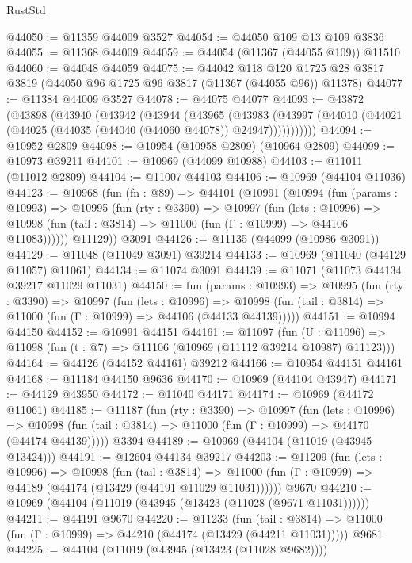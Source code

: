 \begin{lexlean}{RustStd}
\begin{coremodule}
@44050 := @11359 @44009 @3527
@44054 := @44050 @109 @13 @109 @3836
@44055 := @11368 @44009
@44059 := @44054 (@11367 (@44055 @109)) @11510
@44060 := @44048 @44059
@44075 := @44042
    @118
    @120
    @1725
    @28
    @3817
    @3819
    (@44050 @96 @1725 @96 @3817 (@11367 (@44055 @96)) @11378)
@44077 := @11384 @44009 @3527
@44078 := @44075 @44077
@44093 := @43872
    (@43898
      (@43940
        (@43942
          (@43944
            (@43965
              (@43983
                (@43997 (@44010 (@44021 (@44025 (@44035 (@44040 (@44060 @44078)) @24947)))))))))))
@44094 := @10952 @2809
@44098 := @10954 (@10958 @2809) (@10964 @2809)
@44099 := @10973 @39211
@44101 := @10969 (@44099 @10988)
@44103 := @11011 (@11012 @2809)
@44104 := @11007 @44103
@44106 := @10969 (@44104 @11036)
@44123 := @10968
    (fun (fn : @89) =>
    @44101
      (@10991
        (@10994
          (fun (params : @10993) =>
          @10995
            (fun (rty : @3390) =>
            @10997
              (fun (lets : @10996) =>
              @10998 (fun (tail : @3814) => @11000 (fun (Γ : @10999) => @44106 @11083))))))
        @11129))
    @3091
@44126 := @11135 (@44099 (@10986 @3091))
@44129 := @11048 (@11049 @3091) @39214
@44133 := @10969 (@11040 (@44129 @11057) @11061)
@44134 := @11074 @3091
@44139 := @11071 (@11073 @44134 @39217 @11029 @11031)
@44150 := fun (params : @10993) =>
  @10995
    (fun (rty : @3390) =>
    @10997
      (fun (lets : @10996) =>
      @10998 (fun (tail : @3814) => @11000 (fun (Γ : @10999) => @44106 (@44133 @44139)))))
@44151 := @10994 @44150
@44152 := @10991 @44151
@44161 := @11097
    (fun (U : @11096) => @11098 (fun (t : @7) => @11106 (@10969 (@11112 @39214 @10987) @11123)))
@44164 := @44126 (@44152 @44161) @39212
@44166 := @10954 @44151 @44161
@44168 := @11184 @44150 @9636
@44170 := @10969 (@44104 @43947)
@44171 := @44129 @43950
@44172 := @11040 @44171
@44174 := @10969 (@44172 @11061)
@44185 := @11187
    (fun (rty : @3390) =>
    @10997
      (fun (lets : @10996) =>
      @10998 (fun (tail : @3814) => @11000 (fun (Γ : @10999) => @44170 (@44174 @44139)))))
    @3394
@44189 := @10969 (@44104 (@11019 (@43945 @13424)))
@44191 := @12604 @44134 @39217
@44203 := @11209
    (fun (lets : @10996) =>
    @10998
      (fun (tail : @3814) =>
      @11000 (fun (Γ : @10999) => @44189 (@44174 (@13429 (@44191 @11029 @11031))))))
    @9670
@44210 := @10969 (@44104 (@11019 (@43945 (@13423 (@11028 (@9671 @11031))))))
@44211 := @44191 @9670
@44220 := @11233
    (fun (tail : @3814) => @11000 (fun (Γ : @10999) => @44210 (@44174 (@13429 (@44211 @11031)))))
    @9681
@44225 := @44104 (@11019 (@43945 (@13423 (@11028 @9682))))

\end{coremodule}
\end{lexlean}

